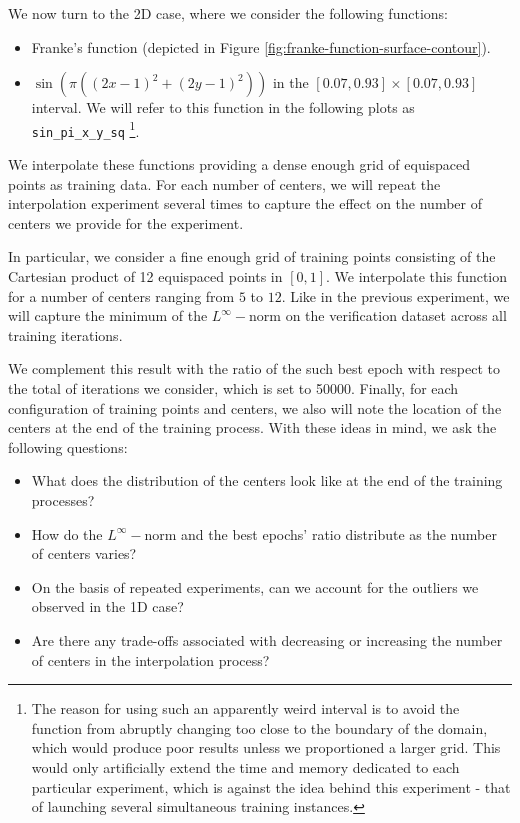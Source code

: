 \documentclass[12pt]{report} %
\begin{document}
We now turn to the 2D case, where we consider the following functions:
\begin{itemize}
  \item Franke's function (depicted in Figure \ref{fig:franke-function-surface-contour}).
  \item $\sin(\pi((2x-1)^2+(2y-1)^2))$ in the $[0.07,0.93]\times[0.07,0.93]$ interval.
        We will refer to this function in the following plots as \texttt{sin\_pi\_x\_y\_sq}
        \footnote{The
          reason for using such an apparently weird interval is to avoid the function from
          abruptly changing too close to the boundary of the domain, which would produce
          poor results unless we proportioned a larger grid. This would only artificially extend the
          time and memory dedicated to each particular experiment, which is against the idea behind this
          experiment - that of launching several simultaneous training instances.}.
\end{itemize}

We interpolate these functions providing a dense enough grid of
equispaced points as training data.
For each number of centers, we will repeat the interpolation experiment
several times to capture the effect on the number of centers we provide for
the experiment.

In particular, we consider a fine enough grid of training points consisting of
the Cartesian product of 12 equispaced points in $[0,1]$. We interpolate this
function for a number of centers ranging from $5$ to $12$. Like in the previous
experiment, we will capture the minimum of the $L^\infty-$norm on the
verification dataset across all training iterations.

We complement
this result with the ratio of the such best epoch with respect to the
total of iterations we consider, which is set to 50000. Finally, for each
configuration of training points and centers, we also will note the location
of the centers at the end of the training process. With these ideas in mind,
we ask the following questions:

\begin{itemize}
  \item What does the distribution of the centers look like at the end of the
        training processes?
  \item How do the $L^\infty-$norm and the best epochs' ratio distribute
        as the number of centers varies?
  \item On the basis of repeated experiments, can we account for the outliers
        we observed in the 1D case?
  \item Are there any trade-offs associated with decreasing
        or increasing the number of centers in the interpolation process?
\end{itemize}
\end{document}
